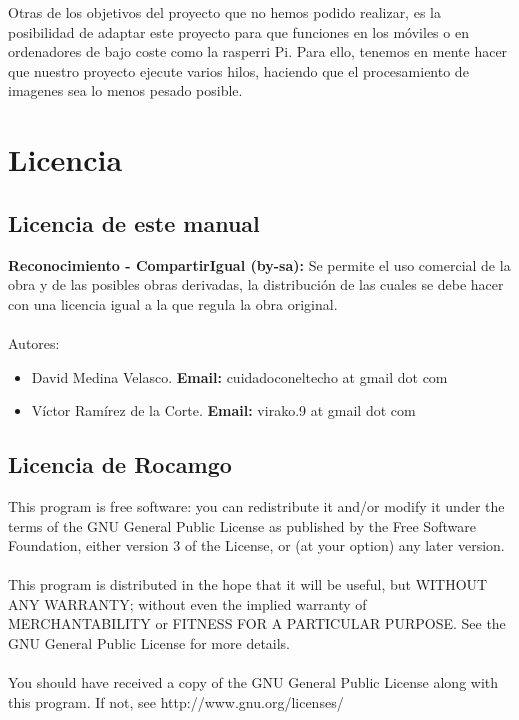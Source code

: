 \documentclass[12pt,a4paper]{report}
\begin{document}
Otras de los objetivos del proyecto que no hemos podido realizar, es
la posibilidad de adaptar este proyecto para que funciones en los móviles o en
ordenadores de bajo coste como la rasperri Pi. Para ello, tenemos en mente hacer que nuestro proyecto ejecute varios hilos, haciendo que el procesamiento de imagenes sea lo menos pesado posible.


\chapter{Licencia}

\section{Licencia de este manual}

\textbf{Reconocimiento - CompartirIgual (by-sa):} Se permite el uso comercial de
la obra y de las posibles obras derivadas, la distribución de las cuales se debe
hacer con una licencia igual a la que regula la obra original. \\ \\


Autores: 
\begin{itemize} 
    \item David Medina Velasco. \textbf{Email:} cuidadoconeltecho at gmail dot com 
    \item Víctor Ramírez de la Corte. \textbf{Email:} virako.9 at gmail dot com 
\end{itemize}

\section{Licencia de Rocamgo}

This program is free software: you can redistribute it and/or modify it under
the terms of the GNU General Public License as published by the Free Software
Foundation, either version 3 of the License, or (at your option) any later
version. \\ \\ This program is distributed in the hope that it will be useful,
but WITHOUT ANY WARRANTY; without even the implied warranty of MERCHANTABILITY
or FITNESS FOR A PARTICULAR PURPOSE.  See the GNU General Public License for
more details. \\ \\ You should have received a copy of the GNU General Public
License along with this program.  If not, see http://www.gnu.org/licenses/
\end{document}
